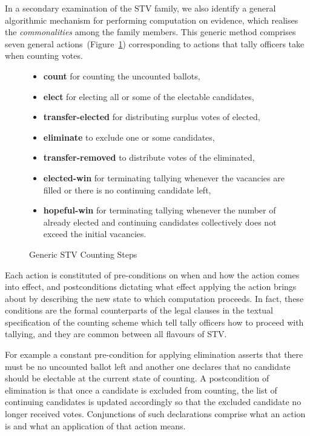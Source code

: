 \documentclass[10pt,conference]{IEEEtran}
\begin{document}
In a secondary examination of the STV family, we also identify a general algorithmic mechanism for performing computation on evidence, which realises the \emph{commonalities} among the family members. This generic method comprises seven general actions~(Figure~\ref{GenSteps}) corresponding to actions that tally officers take when counting votes.
\begin{figure} 
 \begin{itemize}
\item\textbf{count} for counting the uncounted ballots,
\item\textbf{elect} for electing all or some of the electable candidates, 
\item\textbf{transfer-elected} for distributing surplus votes of elected, %
\item\textbf{eliminate} to exclude one or some candidates, 
\item\textbf{transfer-removed} to distribute votes of   the eliminated, %
\item\textbf{elected-win} for terminating tallying whenever the vacancies are filled or there is no continuing candidate left, 
\item\textbf{hopeful-win} for terminating tallying whenever  the number of already elected and continuing candidates collectively does not exceed the initial vacancies. 
\end{itemize}
\caption{Generic STV Counting Steps}
\label{GenSteps}
\end{figure}
Each action is constituted of  pre-conditions on when and how the action comes into effect, and postconditions dictating what effect applying the action brings about by describing the new state to which computation proceeds. In fact, these conditions are the formal counterparts of the legal clauses in the textual specification of the counting scheme which tell tally officers how to proceed with tallying, and they are common between all flavours of STV. 

For example a constant pre-condition for applying elimination  asserts that there must be no uncounted ballot left and another one declares that no candidate should be electable at the current state of counting. A postcondition of elimination is that once a candidate is excluded from counting, the list of continuing candidates is updated accordingly so that the excluded candidate no longer received votes. Conjunctions of such declarations comprise what an action is and what an application of that action means.
\end{document}
